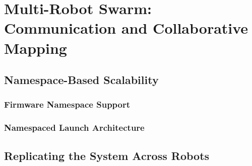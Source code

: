 
\chapter{Multi-Robot Swarm: Communication and Collaborative Mapping}
\label{chap:swarm}


\section{Namespace-Based Scalability}
\label{sec:namespace_scalability}

\subsection{Firmware Namespace Support}
\label{subsec:firmware_namespace}

\subsection{Namespaced Launch Architecture}
\label{subsec:namespaced_launch}

\section{Replicating the System Across Robots}
\label{sec:replicating_robots}

